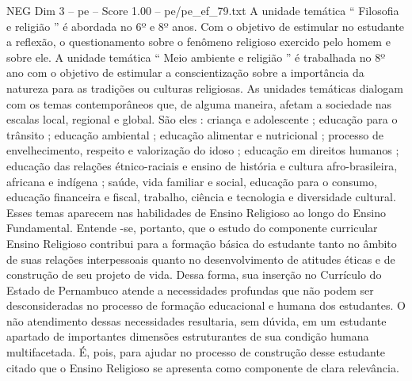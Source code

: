 \begin{textsample}{NEG Dim 3 – pe – Score 1.00 – pe/pe\_ef\_79.txt}
A unidade temática “ Filosofia e religião ” é abordada no 6º e 8º anos.
Com o objetivo de estimular no estudante a reflexão, o questionamento sobre o fenômeno religioso exercido pelo homem e sobre ele.
A unidade temática “ Meio ambiente e religião ” é trabalhada no 8º ano com o objetivo de estimular a conscientização sobre a importância da natureza para as tradições ou culturas religiosas.
As unidades temáticas dialogam com os temas contemporâneos que, de alguma maneira, afetam a sociedade nas escalas local, regional e global.
São eles : criança e adolescente ; educação para o trânsito ; educação ambiental ; educação alimentar e nutricional ; processo de envelhecimento, respeito e valorização do idoso ; educação em direitos humanos ; educação das relações étnico-raciais e ensino de história e cultura afro-brasileira, africana e indígena ; saúde, vida familiar e social, educação para o consumo, educação financeira e fiscal, trabalho, ciência e tecnologia e diversidade cultural.
Esses temas aparecem nas habilidades de Ensino Religioso ao longo do Ensino Fundamental.
Entende -se, portanto, que o estudo do componente curricular Ensino Religioso contribui para a formação básica do estudante tanto no âmbito de suas relações interpessoais quanto no desenvolvimento de atitudes éticas e de construção de seu projeto de vida.
Dessa forma, sua inserção no Currículo do Estado de Pernambuco atende a necessidades profundas que não podem ser desconsideradas no processo de formação educacional e humana dos estudantes.
O não atendimento dessas necessidades resultaria, sem dúvida, em um estudante apartado de importantes dimensões estruturantes de sua condição humana multifacetada.
É, pois, para ajudar no processo de construção desse estudante citado que o Ensino Religioso se apresenta como componente de clara relevância.

\end{textsample}
